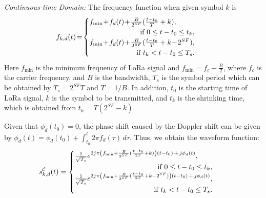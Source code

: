 \documentclass{IEEEtaes}
\theoremstyle{plain}
\begin{document}
\textit{Continuous-time Domain:} The frequency function when given symbol $k$ is 
\begin{equation}
  \label{lora-con-f}
  \begin{aligned} 
    f_{k,d}(t)  & \!=\!\begin{cases}
      f_{\min}\!+\!f_d(t)\!+\!\frac{B}{2^{SF}}(\frac{t-t_0}{T} +k),
      \\ \hfill \hfill \text{if }0\le t-t_0 \le t_k, \\
      f_{\min}\!+\!f_d(t)\!+\!\frac{B}{2^{SF}}(\frac{t-t_0}{T}+k\!-\!2^{SF}), \\ \hfill \hfill \text{if }t_k<  t-t_0 \le T_s.
    \end{cases}
  \end{aligned}
\end{equation}
Here $f_{\min}$ is the minimum frequency of LoRa signal and $f_{\min} = f_c - \frac{B}{2}$, where $f_c$ is the carrier frequency, and $B$ is the bandwidth, $T_s$ is the symbol period which can be obtained by $T_s = 2^{SF}T$ and $T = 1/B$. In addition, $t_0$ is the starting time of LoRa signal, $k$ is the symbol to be transmitted, and $t_k$ is the shrinking time, which is obtained from $t_k = T(2^{SF}-k)$.

Given that $\phi_d(t_0) = 0$, the phase shift caused by the Doppler shift can be given by $\phi_d(t) = \phi_d(t_0) + \int_{t_0}^{t} 2\pi f_d(\tau) \, d\tau$. Thus, we obtain the waveform function:
\begin{equation}
  \label{lora-con-wave}
  \begin{aligned} 
    s^\mathcal{C} _{k,d}(t) & =\begin{cases}
      \frac{1}{\sqrt{T_s}}e^{2j\pi \left(f_{\min}+\frac{B}{2^{SF}}(\frac{t-t_0}{2T} +k)\right)(t-t_0) \,+\, j\phi_d(t)},\\ 
      \hfill \text{if } 0\le t-t_0 \le t_k,\\
      \frac{1}{\sqrt{T_s}}e^{2j\pi \left(f_{\min}+\frac{B}{2^{SF}}(\frac{t-t_0}{2T} +k-2^{SF})\right)(t-t_0) \,+\,j\phi_d(t)},\\ 
      \hfill \text{if } t_k<  t-t_0 \le T_s. 
    \end{cases}
  \end{aligned}
\end{equation}
\end{document}
